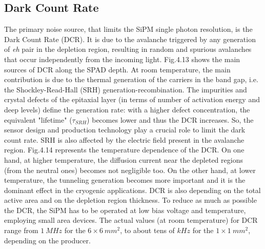 \subsection{Dark Count Rate}
The primary noise source, that limits the SiPM single photon resolution, is the Dark Count Rate (DCR).
It is due to the avalanche triggered by any generation of \textit{eh} pair in the depletion region, resulting in random and spurious avalanches that occur independently from the incoming light.
Fig.4.13 shows the main sources of DCR along the SPAD depth.
At room temperature, the main contribution is due to the thermal generation of the carriers in the band gap, i.e. the Shockley-Read-Hall (SRH) generation-recombination.
The impurities and crystal defects of the epitaxial layer (in terms of number of activation energy and deep levels) define the generation rate: with a higher defect concentration, the equivalent "lifetime" ($\tau_{SRH}$) becomes lower and thus the DCR increases.
So, the sensor design and production technology play a crucial role to limit the dark count rate.
SRH is also affected by the electric field present in the avalanche region.
Fig.4.14 represents the temperature dependence of the DCR.
On one hand, at higher temperature, the diffusion current near the depleted regions (from the neutral ones) becomes not negligible too.
On the other hand, at lower temperature, the tunneling generation becomes more important and it is the dominant effect in the cryogenic applications.
DCR is also depending on the total active area and on the depletion region thickness.
To reduce as much as possible the DCR, the SiPM has to be operated at low bias voltage and temperature, employing small area devices.
The actual values (at room temperature) for DCR range from $1\ MHz$ for the $6\times6\ mm^2$, to about tens of $kHz$ for the $1\times1\ mm^2$, depending on the producer.\\


